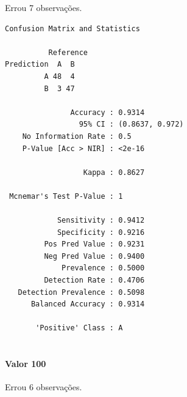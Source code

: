 \documentclass[
  a4paperpaper,
]{article}
\let\oldparagraph\paragraph
\renewcommand{\paragraph}[1]{\oldparagraph{#1}\mbox{}}
\newenvironment{Shaded}{\begin{snugshade}}{\end{snugshade}}
\newcommand{\AttributeTok}[1]{\textcolor[rgb]{0.40,0.45,0.13}{#1}}
\newcommand{\DecValTok}[1]{\textcolor[rgb]{0.68,0.00,0.00}{#1}}
\newcommand{\FunctionTok}[1]{\textcolor[rgb]{0.28,0.35,0.67}{#1}}
\newcommand{\NormalTok}[1]{\textcolor[rgb]{0.00,0.23,0.31}{#1}}
\newcommand{\OtherTok}[1]{\textcolor[rgb]{0.00,0.23,0.31}{#1}}
\newcommand{\SpecialCharTok}[1]{\textcolor[rgb]{0.37,0.37,0.37}{#1}}
\newcommand{\StringTok}[1]{\textcolor[rgb]{0.13,0.47,0.30}{#1}}
\begin{document}
Errou 7 observações.

\begin{Shaded}
\end{Shaded}

\begin{verbatim}
Confusion Matrix and Statistics

          Reference
Prediction  A  B
         A 48  4
         B  3 47
                                         
               Accuracy : 0.9314         
                 95% CI : (0.8637, 0.972)
    No Information Rate : 0.5            
    P-Value [Acc > NIR] : <2e-16         
                                         
                  Kappa : 0.8627         
                                         
 Mcnemar's Test P-Value : 1              
                                         
            Sensitivity : 0.9412         
            Specificity : 0.9216         
         Pos Pred Value : 0.9231         
         Neg Pred Value : 0.9400         
             Prevalence : 0.5000         
         Detection Rate : 0.4706         
   Detection Prevalence : 0.5098         
      Balanced Accuracy : 0.9314         
                                         
       'Positive' Class : A              
                                         
\end{verbatim}

\paragraph{Valor 100}\label{valor-100}

Errou 6 observações.

\begin{Shaded}
\end{Shaded}
\end{document}
